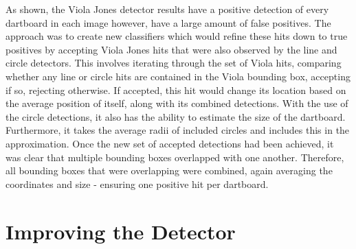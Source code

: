 \documentclass[a4paper]{article}
\begin{document}
As shown, the Viola Jones detector results have a positive detection of every
dartboard in each image however, have a large amount of false positives. The 
approach was to create new classifiers which would refine these hits down to
true positives by accepting Viola Jones hits that were also observed by the
line and circle detectors. This involves iterating through the set of Viola
hits, comparing whether any line or circle hits are contained in the Viola
bounding box, accepting if so, rejecting otherwise. If accepted, this hit would
change its location based on the average position of itself, along with its
combined detections. With the use of the circle detections, it also has the ability to estimate the size of the dartboard. Furthermore, it takes the average
radii of included circles and includes this in the approximation.  Once the new set of accepted detections had been achieved, it was clear that multiple
bounding boxes overlapped with one another. Therefore, all bounding boxes
that were overlapping were combined, again averaging the coordinates and size - ensuring one
positive hit per dartboard.



\section*{Improving the Detector}
\end{document}
